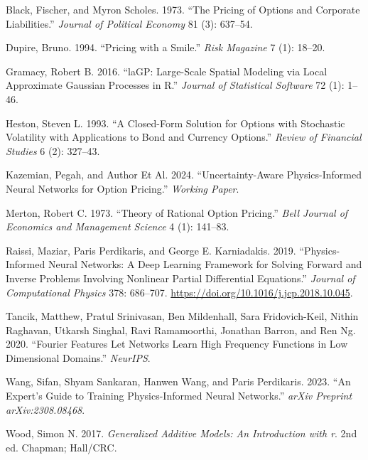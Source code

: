 \documentclass[
  11pt,
]{article}
\newlength{\cslhangindent}
\newenvironment{CSLReferences}[2] %
 {\begin{list}{}{%
  \setlength{\itemindent}{0pt}
  \setlength{\leftmargin}{0pt}
  \setlength{\parsep}{0pt}
  \ifodd #1
   \setlength{\leftmargin}{\cslhangindent}
   \setlength{\itemindent}{-1\cslhangindent}
  \fi
  \setlength{\itemsep}{#2\baselineskip}}}
 {\end{list}}
\begin{document}
\label{refs}
\begin{CSLReferences}{1}{0}
Black, Fischer, and Myron Scholes. 1973. {``The Pricing of Options and
Corporate Liabilities.''} \emph{Journal of Political Economy} 81 (3):
637--54.

Dupire, Bruno. 1994. {``Pricing with a Smile.''} \emph{Risk Magazine} 7
(1): 18--20.

Gramacy, Robert B. 2016. {``{laGP}: Large-Scale Spatial Modeling via
Local Approximate {G}aussian Processes in {R}.''} \emph{Journal of
Statistical Software} 72 (1): 1--46.

Heston, Steven L. 1993. {``A Closed-Form Solution for Options with
Stochastic Volatility with Applications to Bond and Currency Options.''}
\emph{Review of Financial Studies} 6 (2): 327--43.

Kazemian, Pegah, and Author Et Al. 2024. {``Uncertainty-Aware
Physics-Informed Neural Networks for Option Pricing.''} \emph{Working
Paper}.

Merton, Robert C. 1973. {``Theory of Rational Option Pricing.''}
\emph{Bell Journal of Economics and Management Science} 4 (1): 141--83.

Raissi, Maziar, Paris Perdikaris, and George E. Karniadakis. 2019.
{``Physics-Informed Neural Networks: A Deep Learning Framework for
Solving Forward and Inverse Problems Involving Nonlinear Partial
Differential Equations.''} \emph{Journal of Computational Physics} 378:
686--707. \url{https://doi.org/10.1016/j.jcp.2018.10.045}.

Tancik, Matthew, Pratul Srinivasan, Ben Mildenhall, Sara Fridovich-Keil,
Nithin Raghavan, Utkarsh Singhal, Ravi Ramamoorthi, Jonathan Barron, and
Ren Ng. 2020. {``Fourier Features Let Networks Learn High Frequency
Functions in Low Dimensional Domains.''} \emph{NeurIPS}.

Wang, Sifan, Shyam Sankaran, Hanwen Wang, and Paris Perdikaris. 2023.
{``An Expert's Guide to Training Physics-Informed Neural Networks.''}
\emph{arXiv Preprint arXiv:2308.08468}.

Wood, Simon N. 2017. \emph{Generalized Additive Models: An Introduction
with r}. 2nd ed. Chapman; Hall/CRC.

\end{CSLReferences}
\end{document}
